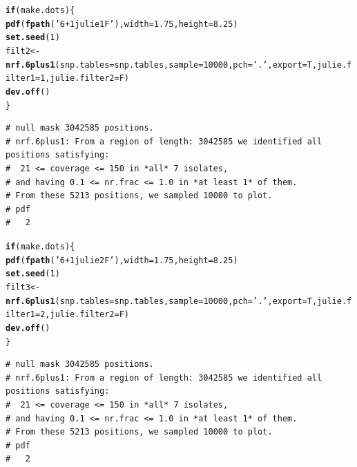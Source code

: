 \documentclass{article}\usepackage[]{graphicx}\usepackage[]{color}
\makeatletter
\newcommand{\hlnum}[1]{\textcolor[rgb]{0.686,0.059,0.569}{#1}}%
\newcommand{\hlstr}[1]{\textcolor[rgb]{0.192,0.494,0.8}{#1}}%
\newcommand{\hlstd}[1]{\textcolor[rgb]{0.345,0.345,0.345}{#1}}%
\newcommand{\hlkwa}[1]{\textcolor[rgb]{0.161,0.373,0.58}{\textbf{#1}}}%
\newcommand{\hlkwb}[1]{\textcolor[rgb]{0.69,0.353,0.396}{#1}}%
\newcommand{\hlkwc}[1]{\textcolor[rgb]{0.333,0.667,0.333}{#1}}%
\newcommand{\hlkwd}[1]{\textcolor[rgb]{0.737,0.353,0.396}{\textbf{#1}}}%
\newenvironment{kframe}{%
 \def\at@end@of@kframe{}%
 \ifinner\ifhmode%
  \def\at@end@of@kframe{\end{minipage}}%
  \begin{minipage}{\columnwidth}%
 \fi\fi%
 \def\FrameCommand##1{\hskip\@totalleftmargin \hskip-\fboxsep
 \colorbox{shadecolor}{##1}\hskip-\fboxsep
     \hskip-\linewidth \hskip-\@totalleftmargin \hskip\columnwidth}%
 \MakeFramed {\advance\hsize-\width
   \@totalleftmargin\z@ \linewidth\hsize
   \@setminipage}}%
 {\par\unskip\endMakeFramed%
 \at@end@of@kframe}
\newenvironment{knitrout}{}{} %
\makeatother
\begin{document}
\begin{knitrout}\footnotesize
{}\color{fgcolor}\begin{kframe}
\begin{alltt}
\hlkwa{if}\hlstd{(make.dots)\{}
  \hlkwd{pdf}\hlstd{(}\hlkwd{fpath}\hlstd{(}\hlstr{'6+1julie1F'}\hlstd{),} \hlkwc{width}\hlstd{=}\hlnum{1.75}\hlstd{,} \hlkwc{height}\hlstd{=}\hlnum{8.25}\hlstd{)}
  \hlkwd{set.seed}\hlstd{(}\hlnum{1}\hlstd{)}
  \hlstd{filt2} \hlkwb{<-} \hlkwd{nrf.6plus1}\hlstd{(}\hlkwc{snp.tables}\hlstd{=snp.tables,}\hlkwc{sample}\hlstd{=}\hlnum{10000}\hlstd{,}\hlkwc{pch}\hlstd{=}\hlstr{'.'}\hlstd{,}\hlkwc{export}\hlstd{=T,}\hlkwc{julie.filter1}\hlstd{=}\hlnum{1}\hlstd{,}\hlkwc{julie.filter2}\hlstd{=F)}
  \hlkwd{dev.off}\hlstd{()}
\hlstd{\}}
\end{alltt}
\begin{verbatim}
# null mask 3042585 positions.
# nrf.6plus1: From a region of length: 3042585 we identified all positions satisfying: 
#  21 <= coverage <= 150 in *all* 7 isolates, 
# and having 0.1 <= nr.frac <= 1.0 in *at least 1* of them. 
# From these 5213 positions, we sampled 10000 to plot.
# pdf 
#   2
\end{verbatim}
\end{kframe}
\end{knitrout}
\begin{knitrout}\footnotesize
{}\color{fgcolor}\begin{kframe}
\begin{alltt}
\hlkwa{if}\hlstd{(make.dots)\{}
  \hlkwd{pdf}\hlstd{(}\hlkwd{fpath}\hlstd{(}\hlstr{'6+1julie2F'}\hlstd{),} \hlkwc{width}\hlstd{=}\hlnum{1.75}\hlstd{,} \hlkwc{height}\hlstd{=}\hlnum{8.25}\hlstd{)}
  \hlkwd{set.seed}\hlstd{(}\hlnum{1}\hlstd{)}
  \hlstd{filt3} \hlkwb{<-} \hlkwd{nrf.6plus1}\hlstd{(}\hlkwc{snp.tables}\hlstd{=snp.tables,}\hlkwc{sample}\hlstd{=}\hlnum{10000}\hlstd{,}\hlkwc{pch}\hlstd{=}\hlstr{'.'}\hlstd{,}\hlkwc{export}\hlstd{=T,}\hlkwc{julie.filter1}\hlstd{=}\hlnum{2}\hlstd{,}\hlkwc{julie.filter2}\hlstd{=F)}
  \hlkwd{dev.off}\hlstd{()}
\hlstd{\}}
\end{alltt}
\begin{verbatim}
# null mask 3042585 positions.
# nrf.6plus1: From a region of length: 3042585 we identified all positions satisfying: 
#  21 <= coverage <= 150 in *all* 7 isolates, 
# and having 0.1 <= nr.frac <= 1.0 in *at least 1* of them. 
# From these 5213 positions, we sampled 10000 to plot.
# pdf 
#   2
\end{verbatim}
\end{kframe}
\end{knitrout}
\end{document}
